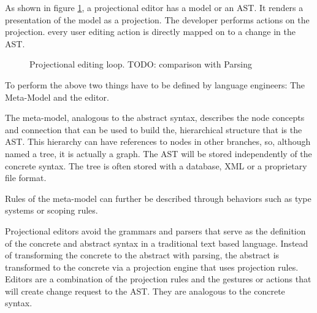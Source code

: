 As shown in figure \ref{fig:projectionalEditing_loop}, a projectional editor has a model or an AST.
It renders a presentation of the model as a projection.
The developer performs actions on the projection.
every user editing action is directly mapped on to a change in the AST.

\begin{figure}[h]
    \centering
    \caption{Projectional editing loop. TODO: comparison with Parsing}
    \label{fig:projectionalEditing_loop}
\end{figure}

To perform the above two things have to be defined by language engineers: The Meta-Model and the editor.

The meta-model, analogous to the abstract syntax, describes the node concepts and connection that can be used to build the, hierarchical structure that is the AST.
This hierarchy can have references to nodes in other branches, so, although named a tree, it is actually a graph.
The AST will be stored independently of the concrete syntax.
The tree is often stored with a database, XML or a proprietary file format.

Rules of the meta-model can further be described through behaviors such as type systems or scoping rules.

Projectional editors avoid the grammars and parsers that serve as the definition of the concrete and abstract syntax in a traditional text based language.
Instead of transforming the concrete to the abstract with parsing, the abstract is transformed to the concrete via a projection engine that uses projection rules.
Editors are a combination of the projection rules and the gestures or actions that will create change request to the AST.
They are analogous to the concrete syntax.

